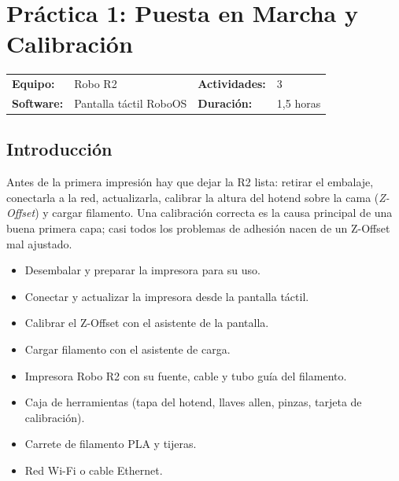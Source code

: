 \chapter{Práctica 1: Puesta en Marcha y Calibración}

\begin{center}
  \small\renewcommand{\arraystretch}{1.3}
  \begin{tabular}{l l l l}
    \textbf{Equipo:}      & Robo R2   &
    \textbf{Actividades:} & 3 \\
    \textbf{Software:}    & Pantalla táctil RoboOS &
    \textbf{Duración:}    & 1,5 horas \\
  \end{tabular}
\end{center}

\section{Introducción}

Antes de la primera impresión hay que dejar la R2 lista: retirar el embalaje, conectarla a la red, actualizarla, calibrar la altura del hotend sobre la cama (\emph{Z-Offset}) y cargar filamento. Una calibración correcta es la causa principal de una buena primera capa; casi todos los problemas de adhesión nacen de un Z-Offset mal ajustado.

\begin{objetivebox}
\begin{itemize}
    \item Desembalar y preparar la impresora para su uso.
    \item Conectar y actualizar la impresora desde la pantalla táctil.
    \item Calibrar el Z-Offset con el asistente de la pantalla.
    \item Cargar filamento con el asistente de carga.
\end{itemize}
\end{objetivebox}

\vspace{6pt}

\begin{materialbox}
\begin{itemize}
    \item Impresora Robo R2 con su fuente, cable y tubo guía del filamento.
    \item Caja de herramientas (tapa del hotend, llaves allen, pinzas, tarjeta de calibración).
    \item Carrete de filamento PLA y tijeras.
    \item Red Wi-Fi o cable Ethernet.
\end{itemize}
\end{materialbox}

